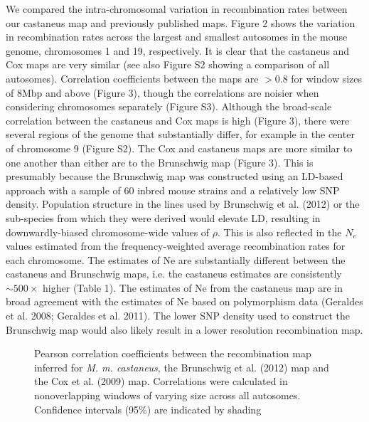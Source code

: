 We compared the intra-chromosomal variation in recombination rates between our castaneus map and previously published maps. Figure 2 shows the variation in recombination rates across the largest and smallest autosomes in the mouse genome, chromosomes 1 and 19, respectively. It is clear that the castaneus and Cox maps are very similar (see also Figure S2 showing a comparison of all autosomes). Correlation coefficients between the maps are $>$0.8 for window sizes of 8Mbp and above (Figure 3), though the correlations are noisier when considering chromosomes separately (Figure S3). Although the broad-scale correlation between the castaneus and Cox maps is high (Figure 3), there were several regions of the genome that substantially differ, for example in the center of chromosome 9 (Figure S2). The Cox and castaneus maps are more similar to one another than either are to the Brunschwig map (Figure 3). This is presumably because the Brunschwig map was constructed using an LD-based approach with a sample of 60 inbred mouse strains and a relatively low SNP density. Population structure in the lines used by Brunschwig et al. (2012) or the sub-species from which they were derived would elevate LD, resulting in downwardly-biased chromosome-wide values of $\rho$. This is also reflected in the $N_e$ values estimated from the frequency-weighted average recombination rates for each chromosome. The estimates of Ne are substantially different between the castaneus and Brunschwig maps, i.e. the castaneus estimates are consistently $\sim500\times$ higher (Table 1). The estimates of Ne from the castaneus map are in broad agreement with the estimates of Ne based on polymorphism data (Geraldes et al. 2008; Geraldes et al. 2011). The lower SNP density used to construct the Brunschwig map would also likely result in a lower resolution recombination map.

\linespread{1}
\begin{figure}[h]
   \centering      
   \noindent{}
 \caption[Broad-scale correlations between recombiantion maps for \emph{Mus musculus castaneus} and \emph{Mus musculus domesticus}]{Pearson correlation coefficients between the recombination map inferred for \emph{M. m. castaneus}, the Brunschwig et al. (2012) map and the Cox et al. (2009) map. Correlations were calculated in nonoverlapping windows of varying size across all autosomes. Confidence intervals (95\%) are indicated by shading}
\end{figure}
\linespread{2}

